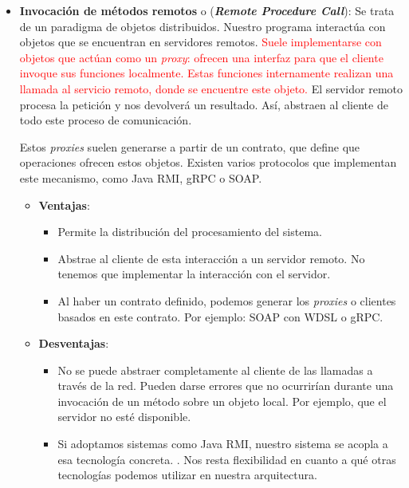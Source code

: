 \begin{itemize}
  \item \textbf{Invocación de métodos remotos} o (\textit{\textbf{Remote Procedure Call}}): Se trata de un paradigma de objetos distribuidos. \cite{taylorSoftwareArchitectureFoundations2009} Nuestro programa interactúa con objetos que se encuentran en servidores remotos. \textcolor{red}{Suele implementarse con objetos que actúan como un \textit{proxy}: ofrecen una interfaz para que el cliente invoque sus funciones localmente. Estas funciones internamente realizan una llamada al servicio remoto, donde se encuentre este objeto.} El servidor remoto procesa la petición y nos devolverá un resultado. Así, abstraen al cliente de todo este proceso de comunicación.

  Estos \textit{proxies} suelen generarse a partir de un contrato, que define que operaciones ofrecen estos objetos.
  Existen varios protocolos que implementan este mecanismo, como Java RMI, gRPC o SOAP.

  \begin{itemize}
    \item \textbf{Ventajas}:
    \begin{itemize}
      \item Permite la distribución del procesamiento del sistema.

      \item Abstrae al cliente de esta interacción a un servidor remoto. No tenemos que implementar la interacción con el servidor.

      \item Al haber un contrato definido, podemos generar los \textit{proxies} o clientes basados en este contrato. Por ejemplo: SOAP con WDSL o gRPC.
    \end{itemize}

    \item \textbf{Desventajas}:
    \begin{itemize}
      \item No se puede abstraer completamente al cliente de las llamadas a través de la red. Pueden darse errores que no ocurrirían durante una invocación de un método sobre un objeto local. Por ejemplo, que el servidor no esté disponible. \cite{jausovecFallaciesDistributedSystems2020}

      \item Si adoptamos sistemas como Java RMI, nuestro sistema se acopla a esa tecnología concreta. \cite{newmanBuildingMicroservicesDesigning2021}. Nos resta flexibilidad en cuanto a qué otras tecnologías podemos utilizar en nuestra arquitectura.


\end{itemize}
\end{itemize}
\end{itemize}
